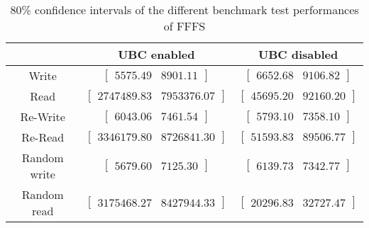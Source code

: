 
	\begin{table}[ht!]
	\caption{80\% confidence intervals of the different benchmark test performances of FFFS}
	\begin{tabular}{| c | c | c |}
	\hline
	{} & \textbf{UBC enabled} & \textbf{UBC disabled} \\
	\hline
	\hline
	Write &$\left[ \begin{array}{rr} 5575.49 & 8901.11 \end{array}\right] $ &$\left[ \begin{array}{rr} 6652.68 & 9106.82 \end{array}\right] $\\ 
Read &$\left[ \begin{array}{rr} 2747489.83 & 7953376.07 \end{array}\right] $ &$\left[ \begin{array}{rr} 45695.20 & 92160.20 \end{array}\right] $\\ 
Re-Write &$\left[ \begin{array}{rr} 6043.06 & 7461.54 \end{array}\right] $ &$\left[ \begin{array}{rr} 5793.10 & 7358.10 \end{array}\right] $\\ 
Re-Read &$\left[ \begin{array}{rr} 3346179.80 & 8726841.30 \end{array}\right] $ &$\left[ \begin{array}{rr} 51593.83 & 89506.77 \end{array}\right] $\\ 
Random write &$\left[ \begin{array}{rr} 5679.60 & 7125.30 \end{array}\right] $ &$\left[ \begin{array}{rr} 6139.73 & 7342.77 \end{array}\right] $\\ 
Random read &$\left[ \begin{array}{rr} 3175468.27 & 8427944.33 \end{array}\right] $ &$\left[ \begin{array}{rr} 20296.83 & 32727.47 \end{array}\right] $\\ 

		\hline
		\end{tabular}
		\label{tbl:bootstrap-table-fffs}
		\end{table}
	